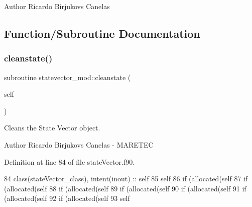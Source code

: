 \begin{DoxyAuthor}{Author}
Ricardo Birjukovs Canelas 
\end{DoxyAuthor}


\subsection{Function/\+Subroutine Documentation}
\mbox{\label{namespacestatevector__mod_acb2d2a7c4c5ee5d86a601be7db58c1df}} 
\subsubsection{\texorpdfstring{cleanstate()}{cleanstate()}}
{\footnotesize\ttfamily subroutine statevector\+\_\+mod\+::cleanstate (\begin{DoxyParamCaption}\item[{class(\mbox{\hyperlink{structstatevector__mod_1_1statevector__class}{statevector\+\_\+class}}), intent(inout)}]{self }\end{DoxyParamCaption})\hspace{0.3cm}{\ttfamily [private]}}



Cleans the State Vector object. 

\begin{DoxyAuthor}{Author}
Ricardo Birjukovs Canelas -\/ M\+A\+R\+E\+T\+EC 
\end{DoxyAuthor}


Definition at line 84 of file state\+Vector.\+f90.


\begin{DoxyCode}
84     \textcolor{keywordtype}{class}(stateVector\_class), \textcolor{keywordtype}{intent(inout)} :: self
85     self%
86     \textcolor{keywordflow}{if} (\textcolor{keyword}{allocated}(self%
87     \textcolor{keywordflow}{if} (\textcolor{keyword}{allocated}(self%
88     \textcolor{keywordflow}{if} (\textcolor{keyword}{allocated}(self%
89     \textcolor{keywordflow}{if} (\textcolor{keyword}{allocated}(self%
90     \textcolor{keywordflow}{if} (\textcolor{keyword}{allocated}(self%
91     \textcolor{keywordflow}{if} (\textcolor{keyword}{allocated}(self%
92     \textcolor{keywordflow}{if} (\textcolor{keyword}{allocated}(self%
93     self%
\end{DoxyCode}
\mbox{\label{namespacestatevector__mod_af0831dbae02e8ec94c576224cae673e5}} 
